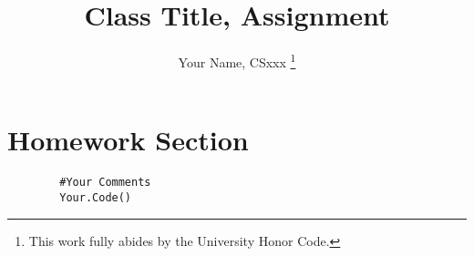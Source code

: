 \documentclass{article}
\begin{document}
\begin{titlepage}

\title{ Class Title, Assignment}
\author{Your Name, CSxxx \thanks{ This work fully abides by the University Honor Code.}}

\maketitle


\end{titlepage}
\section{Homework Section}

	\begin{lstlisting}
		#Your Comments
		Your.Code()
	\end{lstlisting}
\end{document}

